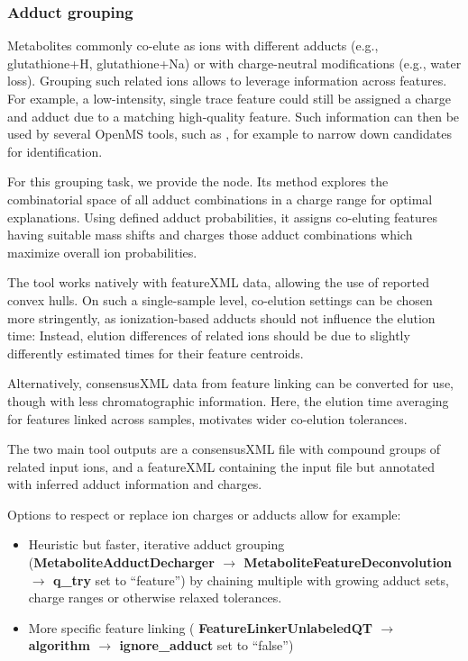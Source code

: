 \subsubsection{Adduct grouping}

Metabolites commonly co-elute as ions with different adducts (e.g., glutathione+H, glutathione+Na) or with charge-neutral modifications (e.g., water loss). Grouping such related ions allows to leverage information across features. For example, a low-intensity, single trace feature could still be assigned a charge and adduct due to a matching high-quality feature. Such information can then be used by several OpenMS tools, such as , for example to narrow down candidates for identification.

\noindent For this grouping task, we provide the  node. Its method explores the combinatorial space of all adduct combinations in a charge range for optimal explanations. Using defined adduct probabilities, it assigns co-eluting features having suitable mass shifts and charges those adduct combinations which maximize overall ion probabilities.

\noindent The tool works natively with featureXML data, allowing the use of reported convex hulls. On such a single-sample level, co-elution settings can be chosen more stringently, as ionization-based adducts should not influence the elution time: Instead, elution differences of related ions should be due to slightly differently estimated times for their feature centroids.

\noindent Alternatively, consensusXML data from feature linking can be converted for use, though with less chromatographic information. Here, the elution time averaging for features linked across samples, motivates wider co-elution tolerances.

\noindent The two main tool outputs are a consensusXML file with compound groups of related input ions, and a featureXML containing the input file but annotated with inferred adduct information and charges.

\noindent Options to respect or replace ion charges or adducts allow for example:
\begin{itemize}
\item Heuristic but faster, iterative adduct grouping (\textbf{MetaboliteAdductDecharger $\rightarrow$ MetaboliteFeatureDeconvolution $\rightarrow$ q\_try} set to “feature”) by chaining multiple  with growing adduct sets, charge ranges or otherwise relaxed tolerances.
\item More specific feature linking (\textbf{ FeatureLinkerUnlabeledQT $\rightarrow$ algorithm $\rightarrow$ ignore\_adduct} set to “false”)
\end{itemize}

